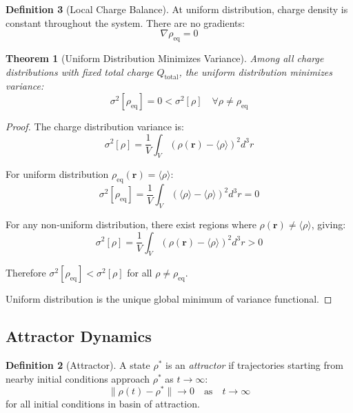 \documentclass[12pt,a4paper]{article}
\theoremstyle{plain}
\newtheorem{theorem}{Theorem}[section]
\theoremstyle{definition}
\newtheorem{definition}[theorem]{Definition}
\theoremstyle{remark}
\begin{document}
\begin{definition}[Local Charge Balance]
At uniform distribution, charge density is constant throughout the system. There are no gradients:
\begin{equation}
\nabla \rho_{\text{eq}} = 0
\end{equation}

\begin{theorem}[Uniform Distribution Minimizes Variance]
\label{thm:uniform_minimizes}
Among all charge distributions with fixed total charge $Q_{\text{total}}$, the uniform distribution minimizes variance:
\begin{equation}
\sigma^2[\rho_{\text{eq}}] = 0 < \sigma^2[\rho] \quad \forall \rho \neq \rho_{\text{eq}}
\end{equation}
\end{theorem}

\begin{proof}
The charge distribution variance is:
\begin{equation}
\sigma^2[\rho] = \frac{1}{V} \int_V (\rho(\mathbf{r}) - \langle \rho \rangle)^2 d^3r
\end{equation}

For uniform distribution $\rho_{\text{eq}}(\mathbf{r}) = \langle \rho \rangle$:
\begin{equation}
\sigma^2[\rho_{\text{eq}}] = \frac{1}{V} \int_V (\langle \rho \rangle - \langle \rho \rangle)^2 d^3r = 0
\end{equation}

For any non-uniform distribution, there exist regions where $\rho(\mathbf{r}) \neq \langle \rho \rangle$, giving:
\begin{equation}
\sigma^2[\rho] = \frac{1}{V} \int_V (\rho(\mathbf{r}) - \langle \rho \rangle)^2 d^3r > 0
\end{equation}

Therefore $\sigma^2[\rho_{\text{eq}}] < \sigma^2[\rho]$ for all $\rho \neq \rho_{\text{eq}}$.

Uniform distribution is the unique global minimum of variance functional.
\end{proof}

\subsection{Attractor Dynamics}

\begin{definition}[Attractor]
\label{def:attractor}
A state $\rho^*$ is an \emph{attractor} if trajectories starting from nearby initial conditions approach $\rho^*$ as $t \to \infty$:
\begin{equation}
\|\rho(t) - \rho^*\| \to 0 \quad \text{as} \quad t \to \infty
\end{equation}
for all initial conditions in basin of attraction.
\end{definition}


\end{definition}
\end{document}
